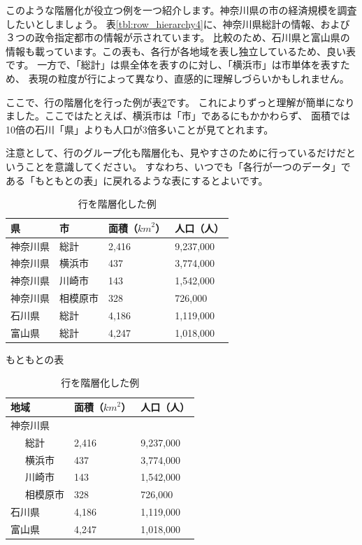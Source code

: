 \documentclass[uplatex,onecolumn,9pt,dvipdfmx]{jsarticle}
\newcommand{\Tref}[1]{表\ref{#1}}
\begin{document}
このような階層化が役立つ例を一つ紹介します。神奈川県の市の経済規模を調査したいとしましょう。
\Tref{tbl:row_hierarchy4}に、神奈川県総計の情報、および３つの政令指定都市の情報が示されています。
比較のため、石川県と富山県の情報も載っています。この表も、各行が各地域を表し独立しているため、良い表です。
一方で、「総計」は県全体を表すのに対し、「横浜市」は市単体を表すため、
表現の粒度が行によって異なり、直感的に理解しづらいかもしれません。

ここで、行の階層化を行った例が\Tref{tbl:row_hierarchy5}です。
これによりずっと理解が簡単になりました。ここではたとえば、横浜市は「市」であるにもかかわらず、
面積では10倍の石川「県」よりも人口が3倍多いことが見てとれます。

注意として、行のグループ化も階層化も、見やすさのために行っているだけだということを意識してください。
すなわち、いつでも「各行が一つのデータ」である「もともとの表」に戻れるような表にするとよいです。

\begin{table}[h]
    \begin{minipage}[t]{0.48\linewidth}
        \centering
        \begin{tabular}{@{}llll@{}} \toprule
            県 & 市 & 面積（${km}^2$） & 人口（人） \\ \midrule
            神奈川県 & 総計 & 2,416 & 9,237,000 \\
            神奈川県 & 横浜市 & 437 & 3,774,000 \\
            神奈川県 & 川崎市 & 143 & 1,542,000 \\
            神奈川県 & 相模原市 & 328 & 726,000 \\
            石川県   & 総計 & 4,186 & 1,119,000 \\
            富山県   & 総計 & 4,247 & 1,018,000 \\ \bottomrule   
        \end{tabular}
        \caption{もともとの表}
        \label{tbl:row_hierarchy4}
    \end{minipage}
    \hfill
    \begin{minipage}[t]{0.48\linewidth}
        \centering
        \begin{tabular}{@{}lll@{}} \toprule
            地域 & 面積（${km}^2$） & 人口（人） \\ \midrule
            神奈川県 & & \\
            ~~~総計  & 2,416 & 9,237,000 \\
            ~~~横浜市 & 437 & 3,774,000 \\
            ~~~川崎市 & 143 & 1,542,000 \\
            ~~~相模原市 & 328 & 726,000 \\
            石川県   & 4,186 & 1,119,000 \\
            富山県   & 4,247 & 1,018,000 \\ \bottomrule   
        \end{tabular}
        \caption{行を階層化した例}
        \label{tbl:row_hierarchy5}
    \end{minipage}
\end{table}
\end{document}
